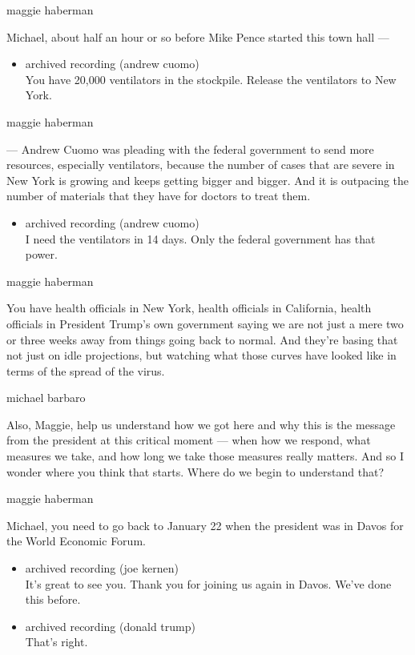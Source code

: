 maggie haberman

Michael, about half an hour or so before Mike Pence started this town
hall ---

\begin{itemize}
\tightlist
\item
  archived recording (andrew cuomo)\\
  You have 20,000 ventilators in the stockpile. Release the ventilators
  to New York.
\end{itemize}

maggie haberman

--- Andrew Cuomo was pleading with the federal government to send more
resources, especially ventilators, because the number of cases that are
severe in New York is growing and keeps getting bigger and bigger. And
it is outpacing the number of materials that they have for doctors to
treat them.

\begin{itemize}
\tightlist
\item
  archived recording (andrew cuomo)\\
  I need the ventilators in 14 days. Only the federal government has
  that power.
\end{itemize}

maggie haberman

You have health officials in New York, health officials in California,
health officials in President Trump's own government saying we are not
just a mere two or three weeks away from things going back to normal.
And they're basing that not just on idle projections, but watching what
those curves have looked like in terms of the spread of the virus.

michael barbaro

Also, Maggie, help us understand how we got here and why this is the
message from the president at this critical moment --- when how we
respond, what measures we take, and how long we take those measures
really matters. And so I wonder where you think that starts. Where do we
begin to understand that?

maggie haberman

Michael, you need to go back to January 22 when the president was in
Davos for the World Economic Forum.

\begin{itemize}
\item
  archived recording (joe kernen)\\
  It's great to see you. Thank you for joining us again in Davos. We've
  done this before.
\item
  archived recording (donald trump)\\
  That's right.
\end{itemize}

